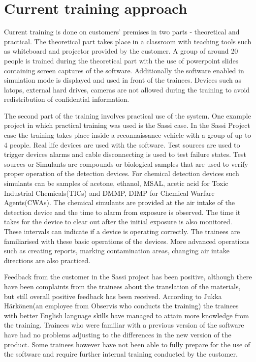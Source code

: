 \documentclass[12pt, a4paper,oneside, nocenter]{thesis}
\begin{document}
\section{Current training approach}
Current training is done on customers' premises in two parts - theoretical and practical. The theoretical part takes place in a classroom with teaching tools such as whiteboard and projector provided by the customer. A group of around 20 people is trained during the theoretical part with the use of powerpoint slides containing screen captures of the software. Additionally the software enabled in simulation mode is displayed and used in front of the trainees. Devices such as latops, external hard drives, cameras are not allowed during the training to avoid redistribution of confidential information.
\par
The second part of the training involves practical use of the system. One example project in which practical training was used is the Sassi case. In the Sassi Project case the training takes place inside a reconnaissance vehicle with a group of up to 4 people. Real life devices are used with the software. Test sources are used to trigger devices alarms and cable disconnecting is used to test failure states.
 Test sources or Simulants are compounds or biological samples that are used to verify proper operation of the detection devices. For chemical detection devices such simulants can be samples of acetone, ethanol, MSAL, acetic acid for Toxic Industrial Chemicals(TICs) and DMMP, DIMP for Chemical Warfare Agents(CWAs). The chemical simulants are provided at the air intake of the detection device and the time to alarm from exposure is observed. The time it takes for the device to clear out after the initial exposure is also monitored. These intervals can indicate if a device is operating correctly. The trainees are familiarised with these basic operations of the devices. More advanced operations such as creating reports, marking contamination areas, changing air intake directions are also practiced.
\par%
Feedback from the customer in the Sassi project has been positive, although there have been complaints from the trainees about the translation of the materials, but still overall positive feedback has been received. According to Jukka Härkönen(an employee from Observis who conducts the training) the trainees with better English language skills have managed to attain more knowledge from the training. Trainees who were familiar with a previous version of the software have had no problems adjusting to the differences in the new version of the product. Some trainees however have not been able to fully prepare for the use of the software and require further internal training conducted by the customer.
\end{document}

